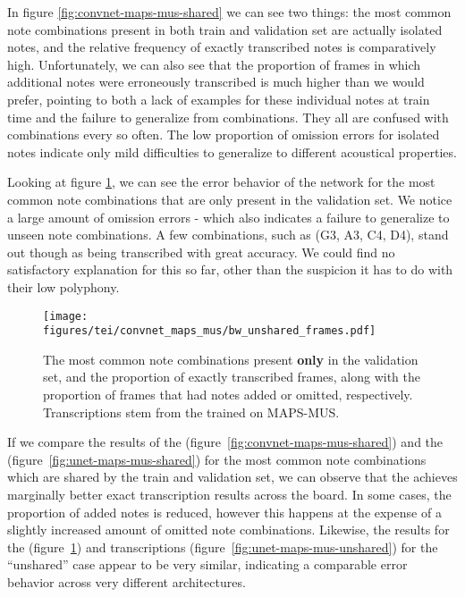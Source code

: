 In figure \ref{fig:convnet-maps-mus-shared} we can see two things: the most common note combinations present in both train and validation set are actually isolated notes, and the relative frequency of exactly transcribed notes is comparatively high. Unfortunately, we can also see that the proportion of frames in which additional notes were erroneously transcribed is much higher than we would prefer, pointing to both a lack of examples for these individual notes at train time and the failure to generalize from combinations. They all are confused with combinations every so often. The low proportion of omission errors for isolated notes indicate only mild difficulties to generalize to different acoustical properties.

Looking at figure \ref{fig:convnet-maps-mus-unshared}, we can see the error behavior of the network for the most common note combinations that are only present in the validation set. We notice a large amount of omission errors - which also indicates a failure to generalize to unseen note combinations. A few combinations, such as (G3, A3, C4, D4), stand out though as being transcribed with great accuracy. We could find no satisfactory explanation for this so far, other than the suspicion it has to do with their low polyphony.

\begin{figure}[ht]
  \centering
  \texttt{[image: figures/tei/convnet\_maps\_mus/bw\_unshared\_frames.pdf]}
  \caption{The most common note combinations present \textbf{only} in the validation set, and the proportion of exactly transcribed frames, along with the proportion of frames that had notes added or omitted, respectively. Transcriptions stem from the \ConvNet trained on MAPS-MUS. \label{fig:convnet-maps-mus-unshared}}
\end{figure}

If we compare the results of the \ConvNet (\mbox{figure \ref{fig:convnet-maps-mus-shared}}) and the \AUNet (\mbox{figure \ref{fig:unet-maps-mus-shared}}) for the most common note combinations which are shared by the train and validation set, we can observe that the \AUNet achieves marginally better exact transcription results across the board. In some cases, the proportion of added notes is reduced, however this happens at the expense of a slightly increased amount of omitted note combinations. Likewise, the results for the \ConvNet (\mbox{figure \ref{fig:convnet-maps-mus-unshared}}) and \AUNet transcriptions (\mbox{figure \ref{fig:unet-maps-mus-unshared}}) for the ``unshared'' case appear to be very similar, indicating a comparable error behavior across very different architectures.

